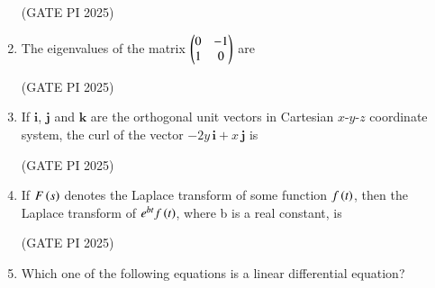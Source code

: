 \documentclass[journal,12pt,onecolumn]{IEEEtran}
\theoremstyle{remark}
\begin{document}
\begin{enumerate}
\hfill (GATE PI 2025)

\item The eigenvalues of the matrix 
$
\begin{pmatrix}
0 &  -1\\
1 & 0 
\end{pmatrix}
$ are

\begin{enumerate}
\end{enumerate}

\hfill (GATE PI 2025)

\item If $\mathbf{i}$, $\mathbf{j}$ and $\mathbf{k}$ are the orthogonal unit vectors in Cartesian $x$-$y$-$z$ coordinate system, the curl of the vector $-2y\,\mathbf{i}+x\,\mathbf{j}$ is

\begin{enumerate}
\end{enumerate}

\hfill (GATE PI 2025)

\item If $F\left(s\right)$ denotes the Laplace transform of some function $f\left(t\right)$, then the Laplace transform of $e^{bt}f\left(t\right)$, where b is a real constant, is

\begin{enumerate}
\end{enumerate}

\hfill (GATE PI 2025)

\item Which one of the following equations is a linear differential equation?


\end{enumerate}
\end{document}
